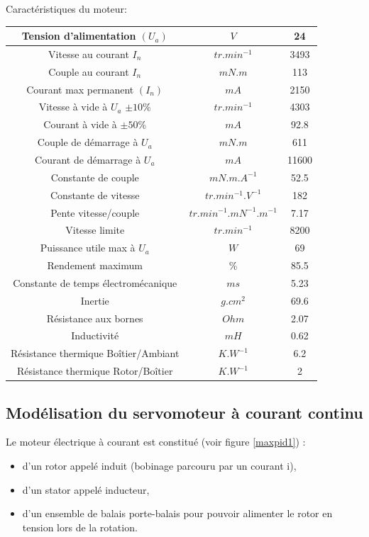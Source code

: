Caractéristiques du moteur:
\begin{center}
\begin{tabular}{|c|c|c|}
\hline
Tension d'alimentation $(U_a)$ & $V$ & 24 \\
\hline
Vitesse au courant $I_n$ & $tr.min^{-1}$ & 3493 \\
\hline
Couple au courant $I_n$ & $mN.m$ & 113 \\
\hline
Courant max permanent $(I_n)$ & $mA$ & 2150 \\
\hline
Vitesse à vide à $U_a$ $\pm 10\%$ & $tr.min^{-1}$ & 4303 \\
\hline
Courant à vide à $\pm 50\%$ & $mA$ & 92.8 \\
\hline
Couple de démarrage à $U_a$ & $mN.m$ & 611\\
\hline
Courant de démarrage à $U_a$ & $mA$ &  11600 \\
\hline
Constante de couple & $mN.m.A^{-1}$ & 52.5 \\
\hline
Constante de vitesse & $tr.min^{-1}.V^{-1}$ & 182 \\
\hline
Pente vitesse/couple & $tr.min^{-1}.mN^{-1}.m^{-1}$ & 7.17 \\
\hline
Vitesse limite & $tr.min^{-1}$ & 8200 \\
\hline
Puissance utile max à $U_a$ & $W$ & 69 \\
\hline
Rendement maximum & \% & 85.5 \\
\hline
Constante de temps électromécanique & $ms$ & 5.23 \\
\hline
Inertie & $g.cm^2$ & 69.6 \\
\hline
Résistance aux bornes & $Ohm$ & 2.07 \\
\hline
Inductivité & $mH$ & 0.62 \\
\hline
Résistance thermique Boîtier/Ambiant & $K.W^{-1}$ & 6.2 \\
\hline
Résistance thermique Rotor/Boîtier & $K.W^{-1}$ & 2 \\
\hline
\end{tabular}
\end{center}

\subsection{Modélisation du servomoteur à courant continu}

Le moteur électrique à courant est constitué (voir figure \ref{maxpid1}) :
\begin{itemize}
 \item d'un rotor appelé induit (bobinage parcouru par un courant i),
 \item d'un stator appelé inducteur,
 \item d'un ensemble de balais porte-balais pour pouvoir alimenter le rotor en tension lors
de la rotation.
\end{itemize}

